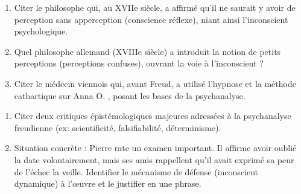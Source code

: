 \documentclass[11pt]{article}
\begin{document}
\begin{exercice}
\begin{enumerate}
    \item Citer le philosophe qui, au XVIIe siècle, a affirmé qu'il ne saurait y avoir de perception sans apperception (conscience réflexe), niant ainsi l'inconscient psychologique.
    \item Quel philosophe allemand (XVIIIe siècle) a introduit la notion de \og petits perceptions \fg{} (perceptions confuses), ouvrant la voie à l'inconscient ?
    \item Citer le médecin viennois qui, avant Freud, a utilisé l'hypnose et la méthode cathartique sur \og Anna O. \fg{}, posant les bases de la psychanalyse.
\end{enumerate}
\end{exercice}

\begin{exercice}
\begin{enumerate}
    \item Citer deux critiques épistémologiques majeures adressées à la psychanalyse freudienne (ex: scientificité, falsifiabilité, déterminisme).
    \item Situation concrète : \og Pierre rate un examen important. Il affirme avoir \og oublié \fg{} la date volontairement, mais ses amis rappellent qu'il avait exprimé sa peur de l'échec la veille. \fg{} Identifier le mécanisme de défense (inconscient dynamique) à l'œuvre et le justifier en une phrase.
\end{enumerate}
\end{exercice}
\end{document}
